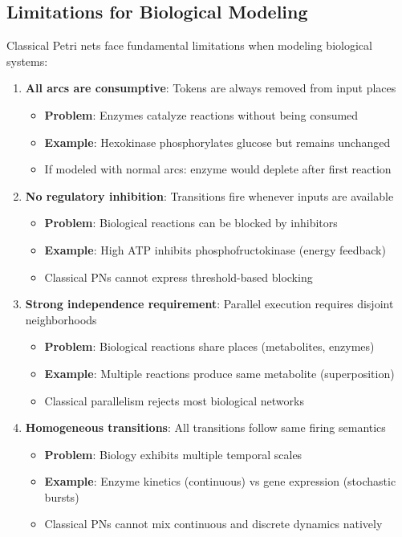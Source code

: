 \subsection{Limitations for Biological Modeling}
\label{subsec:limitations-biological-modeling}

Classical Petri nets face fundamental limitations when modeling biological systems:

\begin{enumerate}
\item \textbf{All arcs are consumptive}: Tokens are always removed from input places
    \begin{itemize}
        \item \textbf{Problem}: Enzymes catalyze reactions without being consumed
        \item \textbf{Example}: Hexokinase phosphorylates glucose but remains unchanged
        \item If modeled with normal arcs: enzyme would deplete after first reaction
    \end{itemize}

\item \textbf{No regulatory inhibition}: Transitions fire whenever inputs are available
    \begin{itemize}
        \item \textbf{Problem}: Biological reactions can be blocked by inhibitors
        \item \textbf{Example}: High ATP inhibits phosphofructokinase (energy feedback)
        \item Classical PNs cannot express threshold-based blocking
    \end{itemize}

\item \textbf{Strong independence requirement}: Parallel execution requires disjoint neighborhoods
    \begin{itemize}
        \item \textbf{Problem}: Biological reactions share places (metabolites, enzymes)
        \item \textbf{Example}: Multiple reactions produce same metabolite (superposition)
        \item Classical parallelism rejects most biological networks
    \end{itemize}

\item \textbf{Homogeneous transitions}: All transitions follow same firing semantics
    \begin{itemize}
        \item \textbf{Problem}: Biology exhibits multiple temporal scales
        \item \textbf{Example}: Enzyme kinetics (continuous) vs gene expression (stochastic bursts)
        \item Classical PNs cannot mix continuous and discrete dynamics natively
    \end{itemize}


\end{enumerate}
